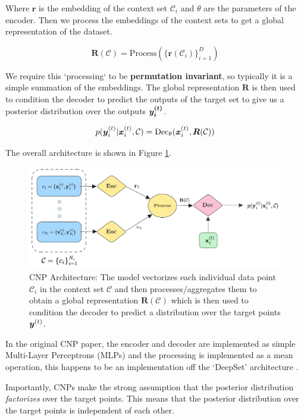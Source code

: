 \documentclass[../../main.tex]{subfiles}
\begin{document}
Where $\bm{r}$ is the embedding of the context set $\mathcal{C}_i$ and $\theta$ are the parameters of the encoder. Then we process the embeddings of the context sets to get a global representation of the dataset. 

\begin{equation}
    \bm{R}(\mathcal{C}) = \text{Process}(\{ \bm{r}(\mathcal{C}_i) \}_{i=1}^D)
\end{equation}

We require this `processing` to be \textbf{permutation invariant}, so typically it is a simple summation of the embeddings. The global representation $\bm{R}$ is then used to condition the decoder to predict the outputs of the target set to give us a posterior distribution over the outputs $\bm{y_i^{(t)}}$.

\begin{equation}
    p(\bm{y}_i^{(t)} | \bm{x}_i^{(t)}, \mathcal{C}) = \text{Dec}_\theta(\bm{x}_i^{(t)}, \bm{R}(\mathcal{C}))
\end{equation}

The overall architecture is shown in Figure \ref{fig:cnp-architecture}.

\begin{figure}[H]
	\centering
	\includegraphics[height=0.3\textwidth]{./cnp.png}
	\caption{CNP Architecture: The model vectorizes each individual data point $\mathcal{C}_i$ in the context set $\mathcal{C}$ and then processes/aggregates them to obtain a global representation $\bm{R}(\mathcal{C})$ which is then used to condition the decoder to predict a distribution over the target points $\bm{y}^{(t)}$.}
    \label{fig:cnp-architecture}
\end{figure}


In the original CNP paper, the encoder and decoder are implemented as simple Multi-Layer Perceptrons (MLPs) and the processing is implemented as a mean operation, this happens to be an implementation off the `DeepSet' architecture \cite{zaheer2018deep}.


Importantly, CNPs make the strong assumption that the posterior distribution \emph{factorizes} over the target points. This means that the posterior distribution over the target points is independent of each other. 
\end{document}
